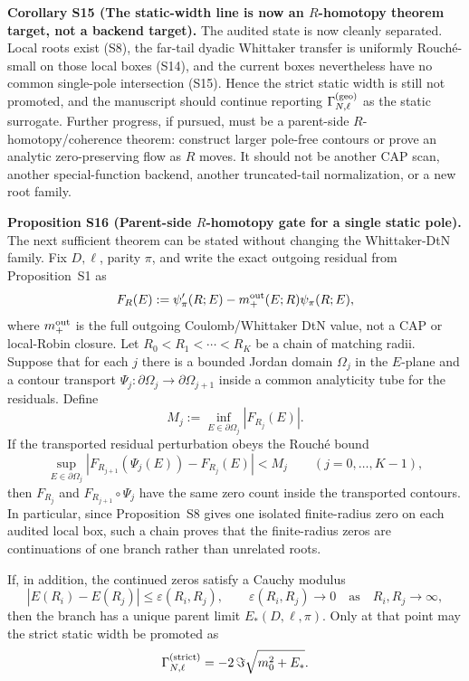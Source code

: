 \documentclass[aps,prd,onecolumn,notitlepage,nofootinbib,superscriptaddress,11pt,floatfix]{revtex4-2}
\begin{document}
\medskip\noindent\textbf{Corollary S15 (The static-width line is now an \(R\)-homotopy theorem target, not a backend target).}
The audited state is now cleanly separated.  Local roots exist (S8), the far-tail dyadic Whittaker transfer is uniformly Rouché-small on those local boxes (S14), and the current boxes nevertheless have no common single-pole intersection (S15).  Hence the strict static width is still not promoted, and the manuscript should continue reporting \(\Gamma_{N,\ell}^{\rm(geo)}\) as the static surrogate.  Further progress, if pursued, must be a parent-side \(R\)-homotopy/coherence theorem: construct larger pole-free contours or prove an analytic zero-preserving flow as \(R\) moves.  It should not be another CAP scan, another special-function backend, another truncated-tail normalization, or a new root family.

\medskip\noindent\textbf{Proposition S16 (Parent-side \(R\)-homotopy gate for a single static pole).}
The next sufficient theorem can be stated without changing the Whittaker-DtN family.  Fix \(D,\ell\), parity \(\pi\), and write the exact outgoing residual from Proposition~S1 as
\[
F_R(E):=
\psi_\pi'(R;E)-m_+^{\rm out}(E;R)\psi_\pi(R;E),
\]
where \(m_+^{\rm out}\) is the full outgoing Coulomb/Whittaker DtN value, not a CAP or local-Robin closure.  Let \(R_0<R_1<\cdots<R_K\) be a chain of matching radii.  Suppose that for each \(j\) there is a bounded Jordan domain \(\Omega_j\) in the \(E\)-plane and a contour transport \(\Psi_j:\partial\Omega_j\to\partial\Omega_{j+1}\) inside a common analyticity tube for the residuals.  Define
\[
M_j:=\inf_{E\in\partial\Omega_j}|F_{R_j}(E)|.
\]
If the transported residual perturbation obeys the Rouché bound
\[
\sup_{E\in\partial\Omega_j}
\left|F_{R_{j+1}}(\Psi_j(E))-F_{R_j}(E)\right|
<M_j
\qquad (j=0,\ldots,K-1),
\]
then \(F_{R_j}\) and \(F_{R_{j+1}}\circ\Psi_j\) have the same zero count inside the transported contours.  In particular, since Proposition~S8 gives one isolated finite-radius zero on each audited local box, such a chain proves that the finite-radius zeros are continuations of one branch rather than unrelated roots.

If, in addition, the continued zeros satisfy a Cauchy modulus
\[
|E(R_i)-E(R_j)|\le \varepsilon(R_i,R_j),
\qquad
\varepsilon(R_i,R_j)\to0
\quad\text{as}\quad
R_i,R_j\to\infty,
\]
then the branch has a unique parent limit \(E_\ast(D,\ell,\pi)\).  Only at that point may the strict static width be promoted as
\[
\Gamma_{N,\ell}^{\rm(strict)}
=-2\,\Im\sqrt{m_0^2+E_\ast}.
\]
\end{document}
